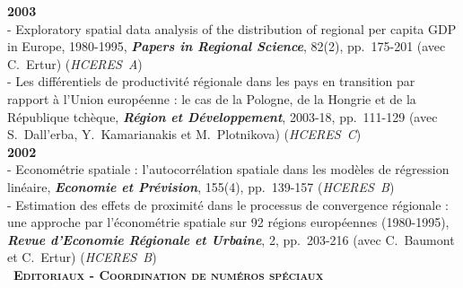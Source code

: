 \documentclass[a4paper,12pt]{article}
\newcommand{\smalltitre}[1]{%
	\noindent \textbullet~\textsc{\textbf{#1}}
	\smallskip
	}
\begin{document}
\noindent \textbf{2003}  \smallskip \\ 
- Exploratory spatial data analysis of the distribution of regional per capita GDP in Europe, 1980-1995, \textit{\textbf{Papers in Regional Science}}, 82(2), pp.~175-201 (avec C.~Ertur) (\textit{HCERES~A}) \\
 - Les différentiels de productivité régionale dans les pays en transition par rapport à l'Union européenne : le cas de la Pologne, de la Hongrie et de la République tchèque, \textit{\textbf{Région et Développement}}, 2003-18, pp.~111-129 (avec S.~Dall'erba, Y.~Kamarianakis et M.~Plotnikova) (\textit{HCERES~C}) \\

\noindent \textbf{2002}  \smallskip \\ 
- Econométrie spatiale : l'autocorrélation spatiale dans les modèles de régression linéaire, \textit{\textbf{Economie et Prévision}}, 155(4), pp.~139-157 (\textit{HCERES~B}) \\
 - Estimation des effets de proximité dans le processus de convergence régionale : une approche par l'économétrie spatiale sur 92 régions européennes (1980-1995), \textit{\textbf{Revue d'Economie Régionale et Urbaine}}, 2, pp.~203-216 (avec C.~Baumont et C.~Ertur) (\textit{HCERES~B}) \\


\smalltitre{Editoriaux - Coordination de numéros spéciaux}\medskip
\end{document}
